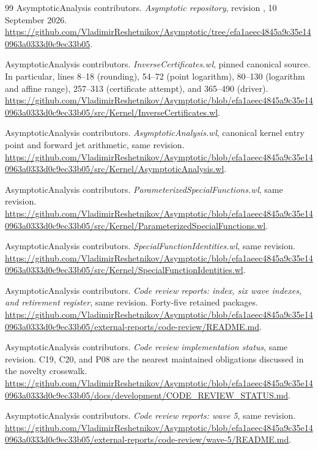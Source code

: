 \documentclass[11pt,letterpaper]{article}
\theoremstyle{remark}\newtheorem{remark}[proposition]{Remark}
\begin{document}
\clearpage
\begin{thebibliography}{99}
\small
{} AsymptoticAnalysis contributors.
\emph{Asymptotic repository}, revision
, 10 September 2026.
\url{https://github.com/VladimirReshetnikov/Asymptotic/tree/efa1aeec4845a9c35e140963a0333d0c9ec33b05}.

 AsymptoticAnalysis contributors.
\emph{InverseCertificates.wl}, pinned canonical source. In particular,
lines 8--18 (rounding), 54--72 (point logarithm), 80--130 (logarithm and affine
range), 257--313 (certificate attempt), and 365--490 (driver).
\url{https://github.com/VladimirReshetnikov/Asymptotic/blob/efa1aeec4845a9c35e140963a0333d0c9ec33b05/src/Kernel/InverseCertificates.wl}.

 AsymptoticAnalysis contributors.
\emph{AsymptoticAnalysis.wl}, canonical kernel entry point and forward jet
arithmetic, same revision.
\url{https://github.com/VladimirReshetnikov/Asymptotic/blob/efa1aeec4845a9c35e140963a0333d0c9ec33b05/src/Kernel/AsymptoticAnalysis.wl}.

 AsymptoticAnalysis contributors.
\emph{ParameterizedSpecialFunctions.wl}, same revision.
\url{https://github.com/VladimirReshetnikov/Asymptotic/blob/efa1aeec4845a9c35e140963a0333d0c9ec33b05/src/Kernel/ParameterizedSpecialFunctions.wl}.

 AsymptoticAnalysis contributors.
\emph{SpecialFunctionIdentities.wl}, same revision.
\url{https://github.com/VladimirReshetnikov/Asymptotic/blob/efa1aeec4845a9c35e140963a0333d0c9ec33b05/src/Kernel/SpecialFunctionIdentities.wl}.

 AsymptoticAnalysis contributors.
\emph{Code review reports: index, six wave indexes, and retirement register},
same revision. Forty-five retained packages.
\url{https://github.com/VladimirReshetnikov/Asymptotic/blob/efa1aeec4845a9c35e140963a0333d0c9ec33b05/external-reports/code-review/README.md}.

 AsymptoticAnalysis contributors.
\emph{Code review implementation status}, same revision. C19, C20, and P08
are the nearest maintained obligations discussed in the novelty crosswalk.
\url{https://github.com/VladimirReshetnikov/Asymptotic/blob/efa1aeec4845a9c35e140963a0333d0c9ec33b05/docs/development/CODE_REVIEW_STATUS.md}.

 AsymptoticAnalysis contributors.
\emph{Code review reports: wave 5}, same revision.
\url{https://github.com/VladimirReshetnikov/Asymptotic/blob/efa1aeec4845a9c35e140963a0333d0c9ec33b05/external-reports/code-review/wave-5/README.md}.


\end{thebibliography}
\end{document}
